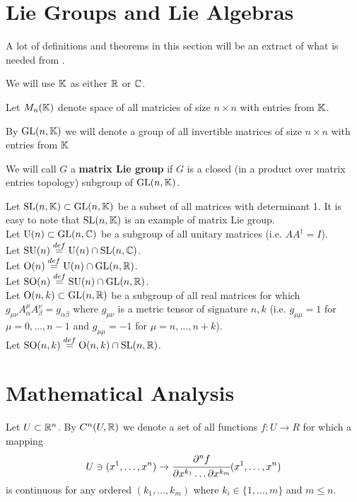 \documentclass[main.tex]{subfiles}
\begin{document}
\section{Lie Groups and Lie Algebras}

A lot of definitions and theorems in this section will be an extract of what is needed from \cite{hall2015}.

We will use $\mathbb{K}$ as either $\mathbb{R}$ or $\mathbb{C}$.

Let $M_n(\mathbb{K})$ denote space of all matricies of size $n\times n$ with entries from $\mathbb{K}$.

By $\text{GL}(n, \mathbb{K})$ we will denote a group of all invertible matrices of size $n\times n$ with entries from $\mathbb{K}$


\begin{definition}
We will call $G$ a \textbf{matrix Lie group} if $G$ is a closed (in a product over matrix entries topology) subgroup of $\text{GL}(n, \mathbb{K})$.
\end{definition}

Let $\text{SL}(n, \mathbb{K}) \subset \text{GL}(n, \mathbb{K})$ be a subset of all matrices with determinant 1. It is easy to note that $\text{SL}(n, \mathbb{K})$ is an example of matrix Lie group.\\

Let $\text{U}(n)\subset \text{GL}(n, \mathbb{C})$ be a subgroup of all unitary matrices (i.e. $AA^\dagger = I$).\\

Let $\text{SU}(n) \stackrel{def}{=}  \text{U}(n) \cap \text{SL}(n, \mathbb{C})$.\\

Let $\text{O}(n) \stackrel{def}{=} \text{U}(n) \cap \text{GL}(n, \mathbb{R})$.\\

Let $\text{SO}(n) \stackrel{def}{=} \text{SU}(n) \cap \text{GL}(n, \mathbb{R})$.\\


Let $\text{O}(n, k) \subset \text{GL}(n, \mathbb{R})$ be a subgroup of all real matrices for which 
$g_{\mu\nu} A^\mu_\alpha A^\nu_\beta = g_{\alpha\beta}$ where $g_{\mu\nu}$ is a metric tensor of signature $n, k$ (i.e. $g_{\mu\mu} = 1$ for $\mu = 0, \dots, n - 1$ and $g_{\mu\mu} = -1$ for $\mu = n, \dots, n + k$).\\

Let $\text{SO}(n, k) \stackrel{def}{=} \text{O}(n, k) \cap \text{SL}(n, \mathbb{R})$.




\section{Mathematical Analysis}
\begin{definition}
Let $U\subset \mathbb{R}^n$.
By $C^n(U, \mathbb{R})$ we denote a set of all functions $f:U\to R$ for which a mapping
\begin{equation}
    U\ni (x^1, \dots, x^n) \to \cfrac{\partial^n f}{\partial x^{k_1} \dots \partial x^{k_m} } (x^1, \dots, x^n)
\end{equation}
is continuous for any ordered $(k_1, \dots, k_m)$ where $k_i\in\{1, \dots, m\}$ and $m\leq n$.
\end{definition}
\end{document}
